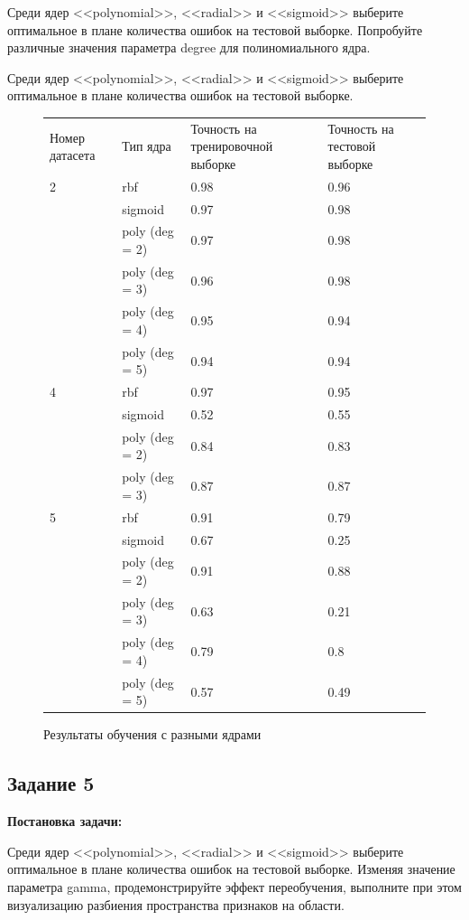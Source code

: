 \documentclass[a4paper,14pt]{article}
\begin{document}
Среди ядер <<polynomial>>, <<radial>> и <<sigmoid>> выберите оптимальное в плане количества ошибок на тестовой выборке. Попробуйте различные значения параметра degree для полиномиального ядра.

Среди ядер <<polynomial>>, <<radial>> и <<sigmoid>> выберите оптимальное в плане количества ошибок на тестовой выборке.

\begin{figure}[H]
\resizebox{\columnwidth}{!}
{
\begin{tabular}{l l l l}
Номер датасета & Тип ядра & Точность на тренировочной выборке & Точность на тестовой выборке\\
2 & rbf & 0.98 & 0.96 \\
 & sigmoid & 0.97 & 0.98  \\
 & poly (deg = 2) & 0.97 & 0.98 \\
 & poly (deg = 3) & 0.96 & 0.98 \\
 & poly (deg = 4) & 0.95 & 0.94 \\
 & poly (deg = 5) & 0.94 & 0.94 \\
4 & rbf & 0.97 & 0.95 \\
 & sigmoid & 0.52 & 0.55 \\
 & poly (deg = 2) & 0.84 & 0.83 \\
 & poly (deg = 3) & 0.87 & 0.87 \\
5 & rbf & 0.91 & 0.79 \\
 & sigmoid & 0.67 & 0.25 \\
 & poly (deg = 2) & 0.91 & 0.88 \\
 & poly (deg = 3) & 0.63 & 0.21 \\
 & poly (deg = 4) & 0.79 & 0.8 \\
 & poly (deg = 5) & 0.57 & 0.49 \\
\end{tabular}
}
\caption{Результаты обучения с разными ядрами}
\label{tbl:kernels}

\end{figure}

\subsection{Задание 5}

\textbf{Постановка задачи:}

Среди ядер <<polynomial>>, <<radial>> и <<sigmoid>> выберите оптимальное в плане количества ошибок на тестовой выборке. Изменяя значение параметра gamma, продемонстрируйте эффект переобучения, выполните при этом визуализацию разбиения пространства признаков на области.
\end{document}

